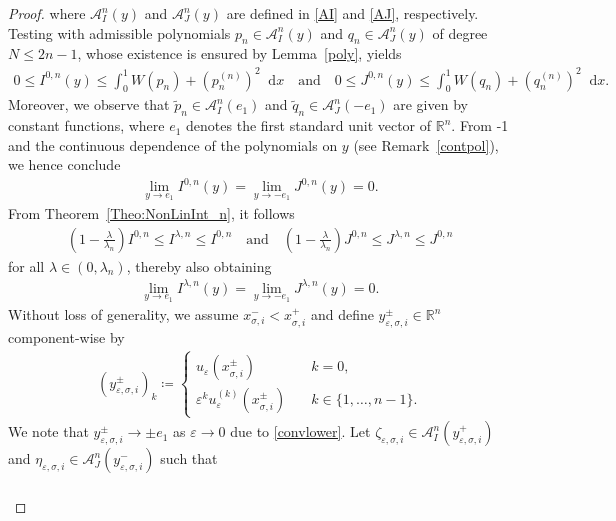 \documentclass{article}
\newcommand{\dd}{\mathop{}\mathrm{d}} %
\newcommand{\lam}{\lambda}
\newcommand{\eps}{\varepsilon}
\numberwithin{figure}{section}
\def\AAA{{\mathcal A}} \def\calB{{\mathcal B}} \def\calC{{\mathcal C}}
\newcommand{\R}{\mathbb{R}}
\numberwithin{equation}{section}
\begin{document}
\begin{proof}
    where $\AAA^n_I(y)$ and $\AAA^n_J(y)$ are defined in \eqref{AI} and \eqref{AJ}, respectively. Testing with admissible polynomials $p_n \in \AAA^n_I(y)$ and $q_n \in \AAA^n_J(y)$ of degree $N \leq 2n-1$, whose existence is ensured by Lemma~\ref{poly}, yields
    \begin{align}
        0 \leq I^{0,n}(y) \leq \int_0^1 W(p_n)+(p_n^{(n)})^2 \dd x  \quad \text{and} \quad  0 \leq J^{0,n}(y) \leq \int_0^1 W(q_n)+(q_n^{(n)})^2 \dd x.
    \end{align}
    Moreover, we observe that $\tilde{p}_n \in \AAA^n_I(e_1)$ and $\tilde{q}_n \in \AAA^n_J(-e_1)$ are given by constant functions, where $e_1$ denotes the first standard unit vector of $\R^n$. From \hyp1 and the continuous dependence of the polynomials on $y$ (see Remark~\ref{contpol}), we hence conclude
    \begin{align}
        \lim_{y \to e_1} I^{0,n}(y) =  \lim_{y \to -e_1} J^{0,n}(y) = 0.
    \end{align}
    From Theorem~\ref{Theo:NonLinInt_n}, it follows
    \begin{align}
        \left(1- \frac \lam{\lam_n}\right)I^{0,n} \leq I^{\lam,n} \leq I^{0,n} \quad \text{and} \quad \left(1- \frac \lam{\lam_n}\right)J^{0,n} \leq J^{\lam,n} \leq J^{0,n}
    \end{align}
    for all $\lam \in (0,\lam_n)$, thereby also obtaining
    \begin{align} \label{IlamJlam_n}
        \lim_{y \to e_1} I^{\lam,n}(y) =  \lim_{y \to -e_1} J^{\lam,n}(y) = 0.
    \end{align}
    Without loss of generality, we assume $x_{\sigma,i}^- < x_{\sigma,i}^+$ and define $y^\pm_{\eps,\sigma,i} \in \R^n$ component-wise by
    \begin{align}
        (y^{\pm}_{\eps,\sigma,i})_k \coloneq \left\{\begin{array}{ll}
    u_\eps(x_{\sigma,i}^\pm) & \quad \text{$k=0$}, \\
    \eps^{k} u^{(k)}_\eps(x_{\sigma,i}^\pm) & \quad \text{$k \in \{1,\ldots,n-1\}$}.
    \end{array}\right.
    \end{align}
    We note that $y_{\eps,\sigma,i}^\pm \to \pm e_1$ as $\eps \to 0$ due to \eqref{convlower}. Let $\zeta_{\eps,\sigma,i} \in \AAA^n_I(y^+_{\eps,\sigma,i})$ and $\eta_{\eps,\sigma,i} \in \AAA^n_J(y^-_{\eps,\sigma,i})$ such that
    \begin{align} \label{abschI_lamJ_lam_n}
    \begin{split}

\end{split}
\end{align}
\end{proof}
\end{document}
